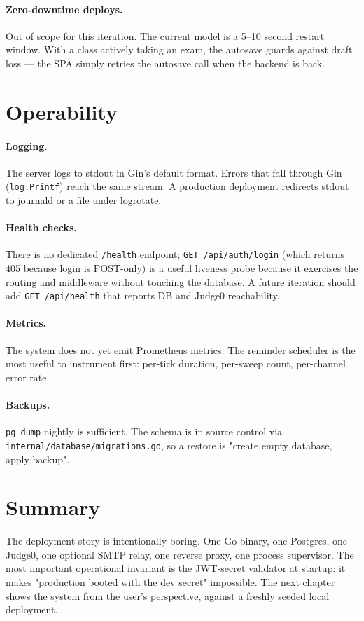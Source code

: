 \paragraph{Zero-downtime deploys.} Out of scope for this iteration. The current model is a 5--10 second restart window. With a class actively taking an exam, the autosave guards against draft loss --- the SPA simply retries the autosave call when the backend is back.

\section{Operability}

\paragraph{Logging.} The server logs to stdout in Gin's default format. Errors that fall through Gin (\texttt{log.Printf}) reach the same stream. A production deployment redirects stdout to journald or a file under logrotate.

\paragraph{Health checks.} There is no dedicated \texttt{/health} endpoint; \texttt{GET /api/auth/login} (which returns 405 because login is POST-only) is a useful liveness probe because it exercises the routing and middleware without touching the database. A future iteration should add \texttt{GET /api/health} that reports DB and Judge0 reachability.

\paragraph{Metrics.} The system does not yet emit Prometheus metrics. The reminder scheduler is the most useful to instrument first: per-tick duration, per-sweep count, per-channel error rate.

\paragraph{Backups.} \texttt{pg\_dump} nightly is sufficient. The schema is in source control via \texttt{internal/database/migrations.go}, so a restore is "create empty database, apply backup".

\section{Summary}

The deployment story is intentionally boring. One Go binary, one Postgres, one Judge0, one optional SMTP relay, one reverse proxy, one process supervisor. The most important operational invariant is the JWT-secret validator at startup: it makes "production booted with the dev secret" impossible. The next chapter shows the system from the user's perspective, against a freshly seeded local deployment.
